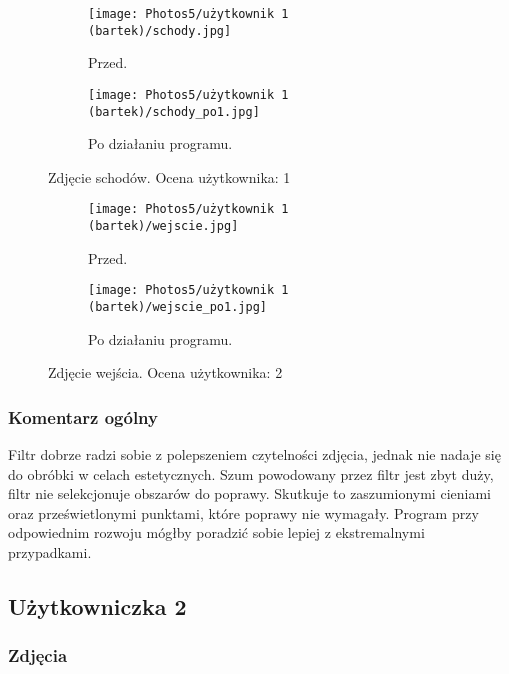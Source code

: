 \documentclass[]{mwart}
\begin{document}
\begin{figure}[h!]
    \centering
    \begin{subfigure}[b]{0.49\textwidth}
        \centering
        \texttt{[image: Photos5/użytkownik 1 (bartek)/schody.jpg]}
        \caption{Przed.}
    \end{subfigure}
    \hfill
    \begin{subfigure}[b]{0.49\textwidth}
        \centering
        \texttt{[image: Photos5/użytkownik 1 (bartek)/schody\_po1.jpg]}
        \caption{Po działaniu programu.}
    \end{subfigure}
    \caption{Zdjęcie schodów. Ocena użytkownika:  1  }
\end{figure}


\begin{figure}[h!]
    \centering
    \begin{subfigure}[b]{0.49\textwidth}
        \centering
        \texttt{[image: Photos5/użytkownik 1 (bartek)/wejscie.jpg]}
        \caption{Przed.}
    \end{subfigure}
    \hfill
    \begin{subfigure}[b]{0.49\textwidth}
        \centering
        \texttt{[image: Photos5/użytkownik 1 (bartek)/wejscie\_po1.jpg]}
        \caption{Po działaniu programu.}
    \end{subfigure}
    \caption{Zdjęcie wejścia. Ocena użytkownika:  2  }
\end{figure}



\newpage
\subsubsection{Komentarz ogólny}
Filtr dobrze radzi sobie z polepszeniem czytelności zdjęcia, jednak nie nadaje się do obróbki w celach estetycznych. Szum powodowany przez filtr jest zbyt duży, filtr nie selekcjonuje obszarów do poprawy. Skutkuje to zaszumionymi cieniami oraz prześwietlonymi punktami, które poprawy nie wymagały. Program przy odpowiednim rozwoju mógłby poradzić sobie lepiej z ekstremalnymi przypadkami.





\newpage
\subsection{Użytkowniczka 2}

\subsubsection{Zdjęcia}
\end{document}

